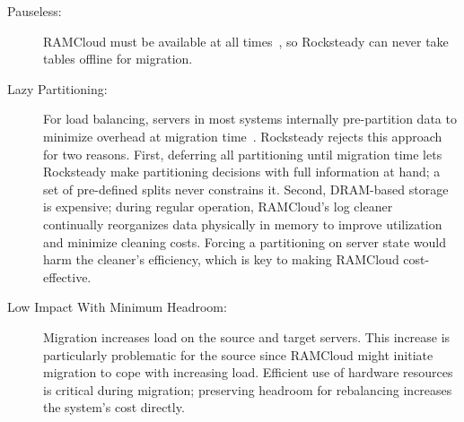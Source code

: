 \begin{description}
\item[Pauseless:]
RAMCloud must be available at all times~\cite{ramcloud-recovery}, so
Rocksteady can never take tables offline for migration.

\item[Lazy Partitioning:]
For load balancing, servers in most systems
internally pre-partition data
to minimize overhead at migration time~\cite{dynamo,farm-2014}.
Rocksteady rejects this approach for two reasons. First, deferring all
partitioning until migration time lets Rocksteady make partitioning
decisions with full information at hand; a set
of pre-defined splits never constrains it. Second, DRAM-based storage is
expensive; during
regular operation, RAMCloud's log cleaner~\cite{ramcloud-lsm}
continually
reorganizes data physically in memory to improve utilization and
minimize cleaning costs. Forcing a partitioning on server state
would harm the cleaner's efficiency, which is key to making RAMCloud
cost-effective.

\item[Low Impact With Minimum Headroom:]
Migration increases load on the source and target servers. This increase
is particularly
problematic for the source since RAMCloud might initiate migration to cope with
increasing load. Efficient use of hardware resources is critical during
migration; preserving headroom for rebalancing increases the
system's cost directly.

\end{description}

